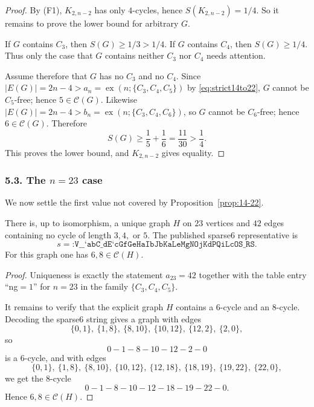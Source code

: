 \begin{proof}
By (F1), $K_{2,n-2}$ has only $4$-cycles, hence $S(K_{2,n-2})=1/4$.
So it remains to prove the lower bound for arbitrary $G$.

If $G$ contains $C_3$, then $S(G)\ge 1/3>1/4$.
If $G$ contains $C_4$, then $S(G)\ge 1/4$.
Thus only the case that $G$ contains neither $C_3$ nor $C_4$ needs attention.

Assume therefore that $G$ has no $C_3$ and no $C_4$.
Since $|E(G)|=2n-4>a_n=\operatorname{ex}(n;\{C_3,C_4,C_5\})$ by \eqref{eq:strict14to22},
$G$ cannot be $C_5$-free; hence $5\in\mathcal C(G)$.
Likewise $|E(G)|=2n-4>b_n=\operatorname{ex}(n;\{C_3,C_4,C_6\})$, so $G$ cannot be $C_6$-free; hence $6\in\mathcal C(G)$.
Therefore
\[
S(G)\ge \frac15+\frac16=\frac{11}{30}>\frac14.
\]
This proves the lower bound, and $K_{2,n-2}$ gives equality.
\end{proof}

\subsubsection*{5.3. The $n=23$ case}

We now settle the first value not covered by Proposition~\ref{prop:14-22}.

\begin{lemma}\label{lem:23-unique}
There is, up to isomorphism, a unique graph $H$ on $23$ vertices and $42$ edges containing no cycle of length $3,4,$ or $5$.
The published sparse6 representative is
\[
s=\texttt{:V\_\_`abC\_dE`cGfGeHaIbJbKaLeMgNOjKdPQiLcOS\_RS}.
\]
For this graph one has $6,8\in\mathcal C(H)$.
\end{lemma}

\begin{proof}
Uniqueness is exactly the statement $a_{23}=42$ together with the table entry ``ng$=1$'' for $n=23$ in the family $\{C_3,C_4,C_5\}$.

It remains to verify that the explicit graph $H$ contains a $6$-cycle and an $8$-cycle.
Decoding the sparse6 string gives a graph with edges
\[
\{0,1\},\ \{1,8\},\ \{8,10\},\ \{10,12\},\ \{12,2\},\ \{2,0\},
\]
so
\[
0-1-8-10-12-2-0
\]
is a $6$-cycle, and with edges
\[
\{0,1\},\ \{1,8\},\ \{8,10\},\ \{10,12\},\ \{12,18\},\ \{18,19\},\ \{19,22\},\ \{22,0\},
\]
we get the $8$-cycle
\[
0-1-8-10-12-18-19-22-0.
\]
Hence $6,8\in\mathcal C(H)$.
\end{proof}

